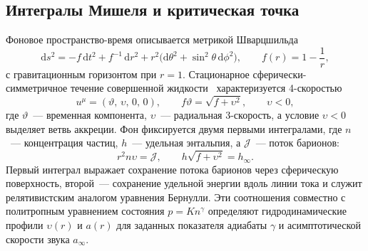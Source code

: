 \documentclass[12pt,a4paper,preprint]{elsarticle}
\begin{document}
        \subsection{Интегралы Мишеля и критическая точка}\label{subsec:michel-integrals}
            Фоновое пространство-время описывается метрикой Шварцшильда
            \begin{equation}
                \mathrm{d}s^{2} = -f\,\mathrm{d}t^{2} + f^{-1}\,\mathrm{d}r^{2} + r^{2}\bigl(\mathrm{d}\theta^{2}+\sin^{2}\theta\,\mathrm{d}\phi^{2}\bigr), \qquad f(r) = 1 - \frac{1}{r},
                \label{eq:schwarzschild-metric}
            \end{equation}
            с гравитационным горизонтом при $r = 1$. Стационарное сферически-симметричное течение совершенной жидкости~\cite{MichelFC_AccretionOfMatterByCondensedObjects_1972} характеризуется 4-скоростью
            \begin{equation}
                u^{\mu} = (\vartheta,\,\upsilon,\,0,\,0), \qquad f\vartheta = \sqrt{f + \upsilon^{2}}, \qquad \upsilon < 0,
                \label{eq:four-velocity}
            \end{equation}
            где $\vartheta$~--- временная компонента, $\upsilon$~--- радиальная 3-скорость, а условие $\upsilon < 0$ выделяет ветвь аккреции. Фон фиксируется двумя первыми интегралами, где $n$~--- концентрация частиц, $h$~--- удельная энтальпия, а $\mathcal{J}$~--- поток барионов:
            \begin{equation}
                r^{2} n \upsilon = \mathcal{J}, \qquad h\sqrt{f + \upsilon^{2}} = h_{\infty}.
                \label{eq:michel-integrals}
            \end{equation}
            Первый интеграл выражает сохранение потока барионов через сферическую поверхность, второй~--- сохранение удельной энергии вдоль линии тока и служит релятивистским аналогом уравнения Бернулли. Эти соотношения совместно с политропным уравнением состояния $p = K n^{\gamma}$ определяют гидродинамические профили $\upsilon(r)$ и $a(r)$ для заданных показателя адиабаты $\gamma$ и асимптотической скорости звука $a_{\infty}$.
            
\end{document}
